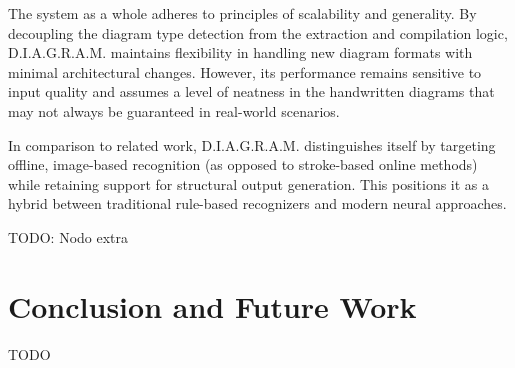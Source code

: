 \documentclass[conference]{IEEEtran}
\begin{document}
The system as a whole adheres to principles of scalability and generality. By decoupling the diagram type detection from the extraction and compilation logic, D.I.A.G.R.A.M. maintains flexibility in handling new diagram formats with minimal architectural changes. However, its performance remains sensitive to input quality and assumes a level of neatness in the handwritten diagrams that may not always be guaranteed in real-world scenarios.

In comparison to related work, D.I.A.G.R.A.M. distinguishes itself by targeting offline, image-based recognition (as opposed to stroke-based online methods) while retaining support for structural output generation. This positions it as a hybrid between traditional rule-based recognizers and modern neural approaches.

TODO: Nodo extra

\section{Conclusion and Future Work}
TODO

\newpage


\newpage
\end{document}
